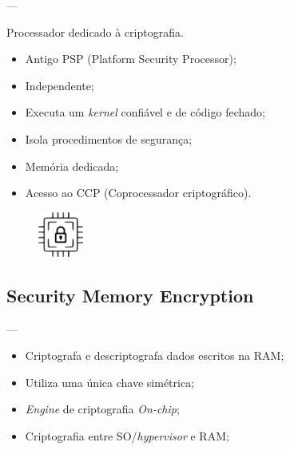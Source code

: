 \documentclass{beamer}
\newcommand{\innertitle}[1]{\textbf{\large {#1}}}
\newcommand{\autotitle}[1]{\secname{} --- \subsecname}
\begin{document}
\begin{frame}{\autotitle{}}
    \innertitle{\subsecname}

    Processador dedicado à criptografia.

    \begin{itemize}
        \item Antigo PSP (Platform Security Processor);
        \item Independente;
        \item Executa um \textit{kernel} confiável e de código fechado;
        \item Isola procedimentos de segurança;
        \item Memória dedicada;
        \item Acesso ao CCP (Coprocessador criptográfico).
    \end{itemize}

    \begin{figure}
        \includegraphics[keepaspectratio,height=4em]{img/crypto-proc}
    \end{figure}
\end{frame}

\subsection{Security Memory Encryption}

\begin{frame}{\autotitle{}}
    \innertitle{\subsecname}

    \begin{itemize}
        \item Criptografa e descriptografa dados escritos na RAM\@;
        \item Utiliza uma única chave simétrica;
        \item \textit{Engine} de criptografia \textit{On-chip};
        \item Criptografia entre SO/\textit{hypervisor} e RAM\@;
    \end{itemize}
\end{frame}
\end{document}
